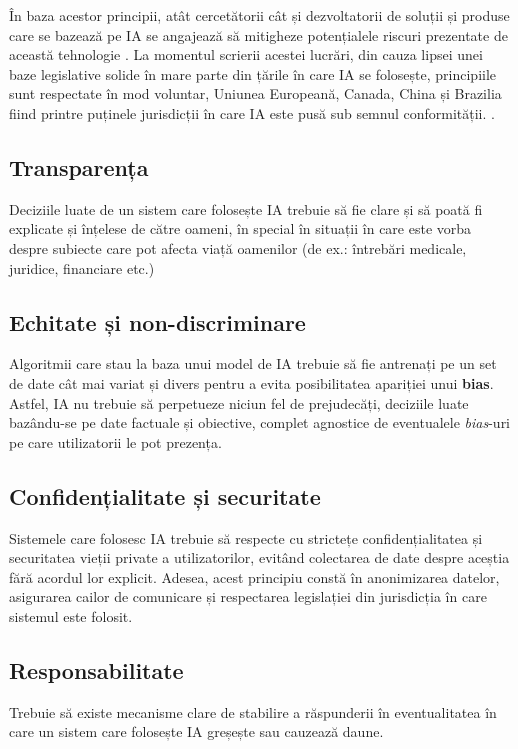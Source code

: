 \documentclass{article}
\begin{document}
În baza acestor principii, atât cercetătorii cât și dezvoltatorii de soluții și produse care se bazează pe IA se angajează să mitigheze potențialele riscuri prezentate de această tehnologie . La momentul scrierii acestei lucrări, din cauza lipsei unei baze legislative solide în mare parte din țările în care IA se folosește, principiile sunt respectate în mod voluntar, Uniunea Europeană, Canada, China și Brazilia fiind printre puținele jurisdicții în care IA este pusă sub semnul conformității. \cite{verifywise}.

\subsection{Transparența}
\quad Deciziile luate de un sistem care folosește IA trebuie să fie clare și să poată fi explicate și înțelese de către oameni, în special în situații în care este vorba despre subiecte care pot afecta viață oamenilor (de ex.: întrebări medicale, juridice, financiare etc.)

\subsection{Echitate și non-discriminare}
\quad Algoritmii care stau la baza unui model de IA trebuie să fie antrenați pe un set de date cât mai variat și divers pentru a evita posibilitatea apariției unui \textbf{bias}. Astfel, IA nu trebuie să perpetueze niciun fel de prejudecăți, deciziile luate bazându-se pe date factuale și obiective, complet agnostice de eventualele \textit{bias}-uri pe care utilizatorii le pot prezența.

\subsection{Confidențialitate și securitate}
\quad Sistemele care folosesc IA trebuie să respecte cu strictețe confidențialitatea și securitatea vieții private a utilizatorilor, evitând colectarea de date despre aceștia fără acordul lor explicit. Adesea, acest principiu constă în anonimizarea datelor, asigurarea cailor de comunicare și respectarea legislației din jurisdicția în care sistemul este folosit. 

\subsection{Responsabilitate}
\quad Trebuie să existe mecanisme clare de stabilire a răspunderii în eventualitatea în care un sistem care folosește IA greșește sau cauzează daune. 
\end{document}
